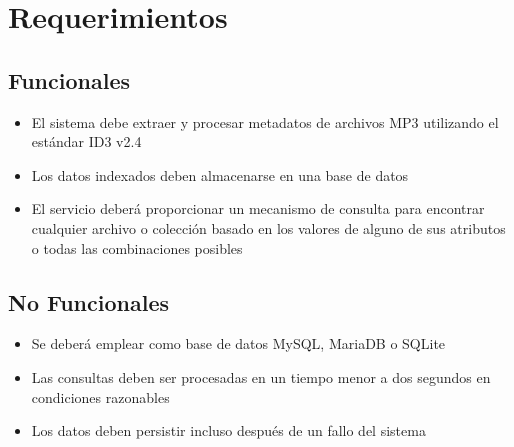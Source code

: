 
\section*{Requerimientos}

\subsection*{Funcionales}
\begin{itemize}
	\item El sistema debe extraer y procesar metadatos de archivos MP3 utilizando el 
	estándar ID3 v2.4
	\item Los datos indexados deben almacenarse en una base de datos
	\item El servicio deberá proporcionar un mecanismo de consulta para encontrar 
	cualquier archivo o colección basado en los valores de alguno de sus atributos o 
	todas las combinaciones posibles
\end{itemize}

\subsection*{No Funcionales}
\begin{itemize}
	\item Se deberá emplear como base de datos MySQL, MariaDB o SQLite
	\item Las consultas deben ser procesadas en un tiempo menor a dos segundos en
	condiciones razonables
	\item Los datos deben persistir incluso después de un fallo del sistema
\end{itemize}
